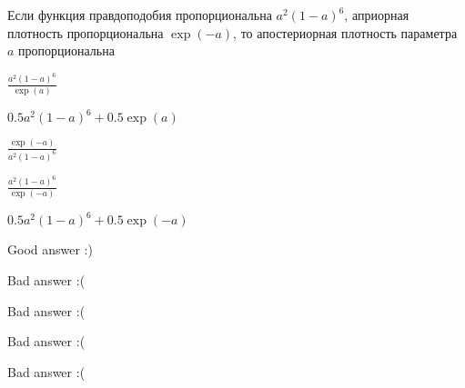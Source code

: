 
\begin{question}
Если функция правдоподобия пропорциональна \(a^2(1-a)^6\), априорная
плотность пропорциональна \(\exp(-a)\), то апостериорная плотность
параметра \(a\) пропорциональна
\begin{answerlist}
  \item \(\frac{a^2(1-a)^6}{\exp(a)}\)
  \item \(0.5 a^2(1-a)^6 +0.5\exp(a)\)
  \item \(\frac{\exp(-a)}{a^2(1-a)^6}\)
  \item \(\frac{a^2(1-a)^6}{\exp(-a)}\)
  \item \(0.5 a^2(1-a)^6 +0.5\exp(-a)\)
\end{answerlist}
\end{question}

\begin{solution}
\begin{answerlist}
  \item Good answer :)
  \item Bad answer :(
  \item Bad answer :(
  \item Bad answer :(
  \item Bad answer :(
\end{answerlist}
\end{solution}

